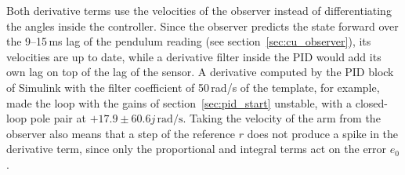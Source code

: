 \documentclass[a4paper,11pt]{article}
\begin{document}
Both derivative terms use the velocities of the observer instead of differentiating the angles inside the controller. Since the observer predicts the state forward over the 9--15\,ms lag of the pendulum reading (see section~\ref{sec:cu_observer}), its velocities are up to date, while a derivative filter inside the PID would add its own lag on top of the lag of the sensor. A derivative computed by the PID block of Simulink with the filter coefficient of 50\,rad/s of the template, for example, made the loop with the gains of section~\ref{sec:pid_start} unstable, with a closed-loop pole pair at $+17.9 \pm 60.6j\,\mathrm{rad/s}$. Taking the velocity of the arm from the observer also means that a step of the reference $r$ does not produce a spike in the derivative term, since only the proportional and integral terms act on the error $e_0$.
\end{document}
